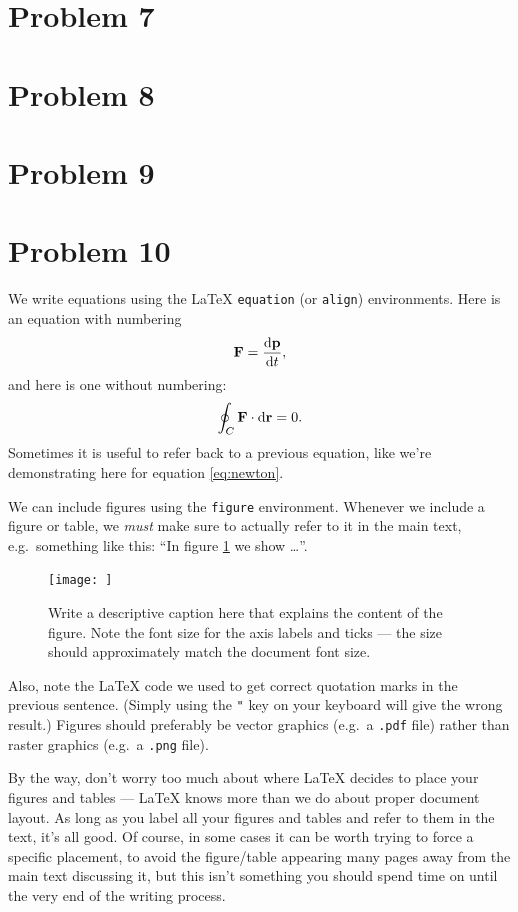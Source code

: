 \documentclass[english,notitlepage]{revtex4-1}  %
\begin{document}
\section*{Problem 7}

\section*{Problem 8}

\section*{Problem 9}

\section*{Problem 10}
We write equations using the LaTeX \texttt{equation} (or \texttt{align}) environments. Here is an equation with numbering
\begin{equation}\label{eq:newton}
  \vb{F} = \dv{\vb{p}}{t},
\end{equation}
and here is one without numbering:
\begin{equation*}
\oint_C \vb{F}\cdot \dd \vb{r} = 0.
\end{equation*}
Sometimes it is useful to refer back to a previous equation, like we're demonstrating here for equation \ref{eq:newton}.

We can include figures using the \texttt{figure} environment. Whenever we include a figure or table, we \textit{must} make sure to actually refer to it in the main text, e.g.\ something like this: ``In figure \ref{fig:rel_err} we show \ldots''.
\begin{figure}%
  \centering %
  \texttt{[image: ]} %
  \caption{Write a descriptive caption here that explains the content of the figure. Note the font size for the axis labels and ticks --- the size should approximately match the document font size.}
  \label{fig:rel_err}
\end{figure}
Also, note the LaTeX code we used to get correct quotation marks in the previous sentence. (Simply using the \texttt{"} key on your keyboard will give the wrong result.) Figures should preferably be vector graphics (e.g.\ a \texttt{.pdf} file) rather than raster graphics (e.g.\ a \texttt{.png} file).

By the way, don't worry too much about where LaTeX decides to place your figures and tables --- LaTeX knows more than we do about proper document layout. As long as you label all your figures and tables and refer to them in the text, it's all good. Of course, in some cases it can be worth trying to force a specific placement, to avoid the figure/table appearing many pages away from the main text discussing it, but this isn't something you should spend time on until the very end of the writing process.
\end{document}
